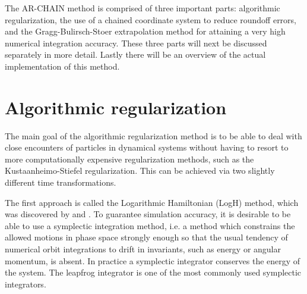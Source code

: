 \documentclass[english, oneside]{HYgradu}
\begin{document}
The AR-CHAIN method is comprised of three important parts: algorithmic regularization, the use of a chained coordinate system to reduce roundoff errors, and the Gragg-Bulirsch-Stoer extrapolation method for attaining a very high numerical integration accuracy. These three parts will next be discussed separately in more detail. Lastly there will be an overview of the actual implementation of this method.





\section{Algorithmic regularization}

The main goal of the algorithmic regularization method is to be able to deal with close encounters of particles in dynamical systems without having to resort to more computationally expensive regularization methods, such as the Kustaanheimo-Stiefel regularization. This can be achieved via two slightly different time transformations. 

The first approach is called the Logarithmic Hamiltonian (LogH) method, which was discovered by \cite{mikkola:1999} and \cite{preto:1999}. To guarantee simulation accuracy, it is desirable to be able to use a symplectic integration method, i.e. a method which constrains the allowed motions in phase space strongly enough so that the usual tendency of numerical orbit integrations to drift in invariants, such as energy or angular momentum, is absent. In practice a symplectic integrator conserves the energy of the system. The leapfrog integrator is one of the most commonly used symplectic integrators.
\end{document}
